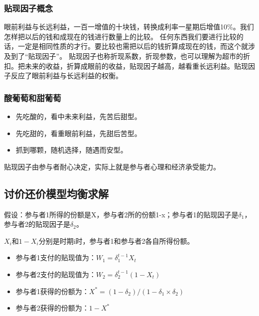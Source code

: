 \documentclass[12pt, a4paper]{article}
\begin{document}
\begin{CJK*}{UTF8}{gbsn}
\begin{flushleft}
        \subsubsection{贴现因子概念}

        眼前利益与长远利益，一百一增值的十块钱，转换成利率一星期后增值10\%。我们怎样把以后的钱和成现在的钱进行数量上的比较。
        任何东西我们要进行比较的话，一定是相同性质的才行。要比较也需把以后的钱折算成现在的钱，而这个就涉及到了“贴现因子”。
        贴现因子也称折现系数，折现参数，也可以理解为超市的折扣。把未来的收益，折算成眼前的收益，贴现因子越高，越看重长远利益。贴现因子反应了眼前利益与长远利益的权衡。

        \subsubsection{酸葡萄和甜葡萄}
        \begin{itemize}
            \item 先吃酸的，看中未来利益，先苦后甜型。
            \item 先吃甜的，看重眼前利益，先甜后苦型。
            \item 抓到哪颗，随机选择，随遇而安型。
        \end{itemize}
        贴现因子由参与者耐心决定，实际上就是参与者心理和经济承受能力。

        \subsection{讨价还价模型均衡求解}
        假设：参与者1所得的份额是X，参与者2所的份额1-x；参与者1的贴现因子是$\delta_1$，参与者2的贴现因子是$\delta_2$。 \par
        $X_i$和$1-X_i$分别是时期i时，参与者1和参与者2各自所得份额。
        \begin{itemize}
            \item 参与者1支付的贴现值为：$W_1=\delta^{t-1}_1X_t$
            \item 参与者2支付的贴现值为：$W_2=\delta^{t-1}_2(1-X_t)$
            \item 参与者1获得的份额为：$X^*=(1-\delta_2)/(1-\delta_1 \times \delta_2)$
            \item 参与者2获得的份额为：$1-X^*$ \par
        \end{itemize}


\end{flushleft}
\end{CJK*}
\end{document}
